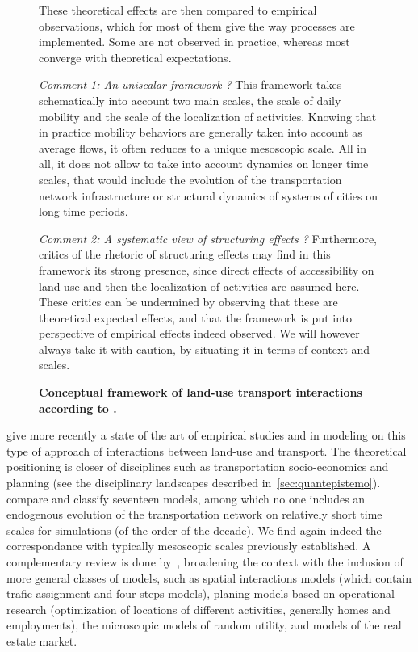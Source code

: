 \documentclass[galley]{jtlu-article-2col}
\begin{document}
\begin{figure}[h!]
\begin{mdframed}
		These theoretical effects are then compared to empirical observations, which for most of them give the way processes are implemented. Some are not observed in practice, whereas most converge with theoretical expectations.		
			
		
		\bigskip
		
		\textit{Comment 1: An uniscalar framework ?} This framework takes schematically into account two main scales, the scale of daily mobility and the scale of the localization of activities. Knowing that in practice mobility behaviors are generally taken into account as average flows, it often reduces to a unique mesoscopic scale. All in all, it does not allow to take into account dynamics on longer time scales, that would include the evolution of the transportation network infrastructure or structural dynamics of systems of cities on long time periods.
				
		
		\bigskip
		
		\textit{Comment 2: A systematic view of structuring effects ?} Furthermore, critics of the rhetoric of structuring effects may find in this framework its strong presence, since direct effects of accessibility on land-use and then the localization of activities are assumed here. These critics can be undermined by observing that these are theoretical expected effects, and that the framework is put into perspective of empirical effects indeed observed. We will however always take it with caution, by situating it in terms of context and scales.
				
		\bigskip
		
		\textbf{Conceptual framework of land-use transport interactions according to \cite{wegener2004land}.}\label{frame:modelingsa:wegener}
	\end{mdframed}
\end{figure}




\cite{wegener2004land} give more recently a state of the art of empirical studies and in modeling on this type of approach of interactions between land-use and transport. The theoretical positioning is closer of disciplines such as transportation socio-economics and planning (see the disciplinary landscapes described in~\ref{sec:quantepistemo}). \cite{wegener2004land} compare and classify seventeen models, among which no one includes an endogenous evolution of the transportation network on relatively short time scales for simulations (of the order of the decade). We find again indeed the correspondance with typically mesoscopic scales previously established. A complementary review is done by~\cite{chang2006models}, broadening the context with the inclusion of more general classes of models, such as spatial interactions models (which contain trafic assignment and four steps models), planing models based on operational research (optimization of locations of different activities, generally homes and employments), the microscopic models of random utility, and models of the real estate market.
\end{document}
